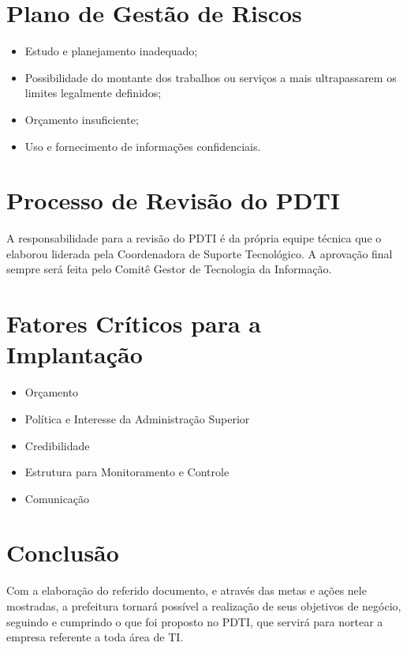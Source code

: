 \documentclass[        
    a4paper,          %
    12pt,             %
    chapter=TITLE,    %
    section=Title,    %
    subsection=Title, %
    oneside,          %
    english,          %
    spanish,          %
    brazil,           %
    sumario=abnt-6027-2012,
]{abntex2}
\begin{document}
\section{Plano de Gestão de Riscos}
\begin{itemize}
	\item Estudo e planejamento inadequado;
	\item Possibilidade do montante dos trabalhos ou serviços a mais ultrapassarem os limites legalmente definidos;
	\item Orçamento insuficiente;
	\item Uso e fornecimento de informações confidenciais.
\end{itemize}

\section{Processo de Revisão do PDTI}
A responsabilidade para a revisão do PDTI é da própria equipe técnica que o elaborou liderada pela Coordenadora de Suporte Tecnológico. A
aprovação final sempre será feita pelo Comitê Gestor de Tecnologia da Informação.

\section{Fatores Críticos para a Implantação}

\begin{itemize}
	\item Orçamento
	\item Política e Interesse da Administração Superior
	\item Credibilidade
	\item Estrutura para Monitoramento e Controle
	\item Comunicação
\end{itemize}


\section{Conclusão}
Com a elaboração do referido documento, e através das metas e ações nele mostradas, a prefeitura tornará possível a realização de seus  
objetivos de negócio, seguindo e cumprindo o que foi proposto no PDTI, que servirá para nortear a empresa referente a toda área de TI.
\end{document}
